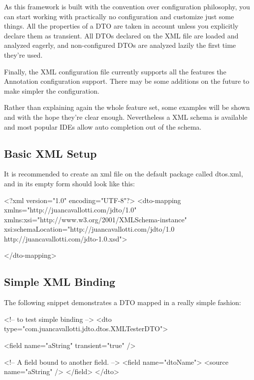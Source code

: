 \documentclass[11pt]{article}
\begin{document}
As this framework is built with the convention over configuration philosophy, you can start working with practically no configuration and customize just some things. All the properties of a DTO are taken in account unless you explicitly declare them as transient. All DTOs declared on the XML file are loaded and analyzed eagerly, and non-configured DTOs are analyzed lazily the first time they're used.


Finally, the XML configuration file currently supports all the features the Annotation configuration support. There may be some additions on the future to make simpler the configuration.


Rather than explaining again the whole feature set, some examples will be shown and with the hope they're clear enough. Nevertheless a XML schema is available and most popular IDEs allow auto completion out of the schema.


\subsection{Basic XML Setup}

It is recommended to create an xml file on the default package called dtos.xml, and in its empty form should look like this:

\begin{xml}
<?xml version="1.0" encoding="UTF-8"?>
<dto-mapping 
    xmlns="http://juancavallotti.com/jdto/1.0" 
    xmlns:xsi="http://www.w3.org/2001/XMLSchema-instance"
    xsi:schemaLocation="http://juancavallotti.com/jdto/1.0 
                        http://juancavallotti.com/jdto-1.0.xsd">
        
</dto-mapping>
\end{xml}


\subsection{Simple XML Binding}

The following snippet demonstrates a DTO mapped in a really simple fashion:

\begin{xml}
<!-- to test simple binding -->
<dto type="com.juancavallotti.jdto.dtos.XMLTesterDTO">

    <field name="aString" transient="true" />

    <!-- A field bound to another field. -->
    <field name="dtoName">
        <source name="aString" />
    </field>
</dto>
\end{xml}
\end{document}
